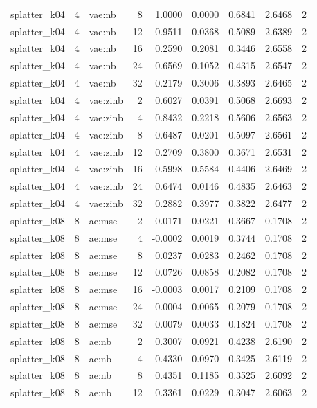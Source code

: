 \begin{tabular}{lrlrrrrrr}
splatter\_k04 & 4 & vae:nb & 8 & 1.0000 & 0.0000 & 0.6841 & 2.6468 & 2 \\
splatter\_k04 & 4 & vae:nb & 12 & 0.9511 & 0.0368 & 0.5089 & 2.6389 & 2 \\
splatter\_k04 & 4 & vae:nb & 16 & 0.2590 & 0.2081 & 0.3446 & 2.6558 & 2 \\
splatter\_k04 & 4 & vae:nb & 24 & 0.6569 & 0.1052 & 0.4315 & 2.6547 & 2 \\
splatter\_k04 & 4 & vae:nb & 32 & 0.2179 & 0.3006 & 0.3893 & 2.6465 & 2 \\
splatter\_k04 & 4 & vae:zinb & 2 & 0.6027 & 0.0391 & 0.5068 & 2.6693 & 2 \\
splatter\_k04 & 4 & vae:zinb & 4 & 0.8432 & 0.2218 & 0.5606 & 2.6563 & 2 \\
splatter\_k04 & 4 & vae:zinb & 8 & 0.6487 & 0.0201 & 0.5097 & 2.6561 & 2 \\
splatter\_k04 & 4 & vae:zinb & 12 & 0.2709 & 0.3800 & 0.3671 & 2.6531 & 2 \\
splatter\_k04 & 4 & vae:zinb & 16 & 0.5998 & 0.5584 & 0.4406 & 2.6469 & 2 \\
splatter\_k04 & 4 & vae:zinb & 24 & 0.6474 & 0.0146 & 0.4835 & 2.6463 & 2 \\
splatter\_k04 & 4 & vae:zinb & 32 & 0.2882 & 0.3977 & 0.3822 & 2.6477 & 2 \\
splatter\_k08 & 8 & ae:mse & 2 & 0.0171 & 0.0221 & 0.3667 & 0.1708 & 2 \\
splatter\_k08 & 8 & ae:mse & 4 & -0.0002 & 0.0019 & 0.3744 & 0.1708 & 2 \\
splatter\_k08 & 8 & ae:mse & 8 & 0.0237 & 0.0283 & 0.2462 & 0.1708 & 2 \\
splatter\_k08 & 8 & ae:mse & 12 & 0.0726 & 0.0858 & 0.2082 & 0.1708 & 2 \\
splatter\_k08 & 8 & ae:mse & 16 & -0.0003 & 0.0017 & 0.2109 & 0.1708 & 2 \\
splatter\_k08 & 8 & ae:mse & 24 & 0.0004 & 0.0065 & 0.2079 & 0.1708 & 2 \\
splatter\_k08 & 8 & ae:mse & 32 & 0.0079 & 0.0033 & 0.1824 & 0.1708 & 2 \\
splatter\_k08 & 8 & ae:nb & 2 & 0.3007 & 0.0921 & 0.4238 & 2.6190 & 2 \\
splatter\_k08 & 8 & ae:nb & 4 & 0.4330 & 0.0970 & 0.3425 & 2.6119 & 2 \\
splatter\_k08 & 8 & ae:nb & 8 & 0.4351 & 0.1185 & 0.3525 & 2.6092 & 2 \\
splatter\_k08 & 8 & ae:nb & 12 & 0.3361 & 0.0229 & 0.3047 & 2.6063 & 2 \\

\end{tabular}
